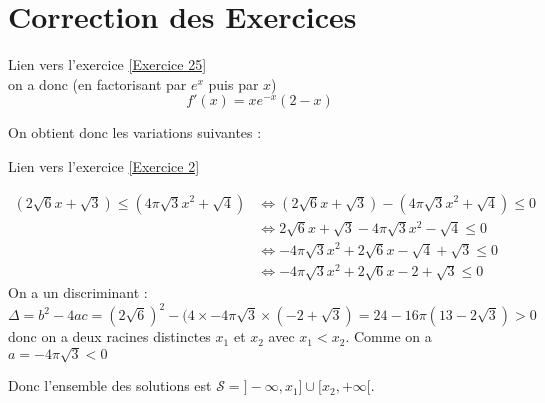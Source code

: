 \documentclass[12pt,fleqn]{report} %
\begin{document}
\chapter{Correction des Exercices}
\begin{correction}Lien vers l'exercice   \ref{Exercice 25}\\
	on a donc (en factorisant par $e^x$ puis par $x$)
	\[f'(x) = xe^{-x}(2-x)\]
	
	
	On obtient donc les variations suivantes : 
	
	\begin{center}
	\end{center}
	
\end{correction}

\begin{correction}Lien vers l'exercice   \ref{Exercice 2}
	
	\begin{align*}
	(2 \sqrt{6} x + \sqrt{3}) \le (4\pi \sqrt{3} x^2 + \sqrt{4})  & \iff (2 \sqrt{6} x + \sqrt{3}) - (4\pi \sqrt{3} x^2 + \sqrt{4})\le 0\\
	& \iff 2 \sqrt{6}x + \sqrt{3} - 4\pi \sqrt{3} x^2 - \sqrt{4}\le 0\\
	& \iff -4\pi\sqrt{3}x^2 + 2\sqrt{6}x -\sqrt{4}+\sqrt{3} \leq 0\\
	& \iff -4\pi\sqrt{3}x^2 + 2\sqrt{6}x -2+\sqrt{3} \leq 0
	\end{align*}
	On a un discriminant : 
	\[\Delta =b^2 - 4ac = (2\sqrt{6})^2 - (4 \times -4\pi\sqrt{3} \times (-2+\sqrt{3}) = 24-16\pi(13 -2\sqrt{3}) > 0\]
	donc on a deux racines distinctes $x_1$ et $x_2$ avec $x_1 < x_2$. Comme on a $a = -4\pi \sqrt{3} < 0$
	\begin{center}
	\end{center}
	Donc l'ensemble des solutions est $\mathcal{S} = ]-\infty,x_1]\cup[x_2,+\infty[$.
\end{correction}
\end{document}
